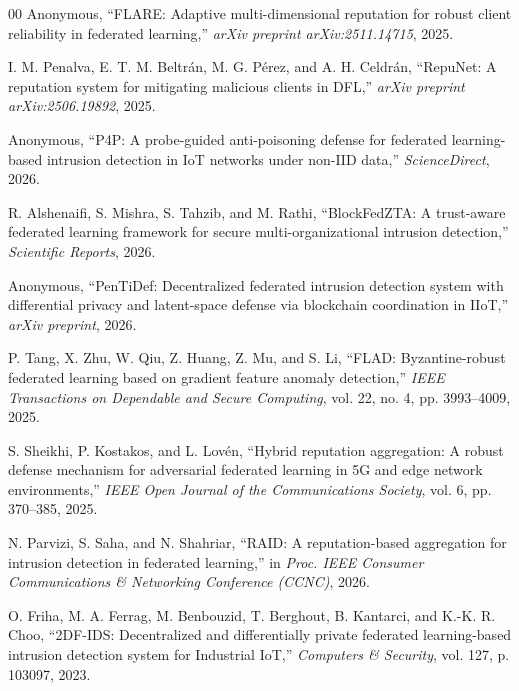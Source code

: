 \documentclass[conference]{IEEEtran}
\begin{document}
\begin{thebibliography}{00}
Anonymous, ``FLARE: Adaptive multi-dimensional reputation for robust client reliability in federated learning,'' \emph{arXiv preprint arXiv:2511.14715}, 2025.

I. M. Penalva, E. T. M. Beltr\'an, M. G. P\'erez, and A. H. Celdr\'an, ``RepuNet: A reputation system for mitigating malicious clients in DFL,'' \emph{arXiv preprint arXiv:2506.19892}, 2025.

Anonymous, ``P4P: A probe-guided anti-poisoning defense for federated learning-based intrusion detection in IoT networks under non-IID data,'' \emph{ScienceDirect}, 2026.

R. Alshenaifi, S. Mishra, S. Tahzib, and M. Rathi, ``BlockFedZTA: A trust-aware federated learning framework for secure multi-organizational intrusion detection,'' \emph{Scientific Reports}, 2026.

Anonymous, ``PenTiDef: Decentralized federated intrusion detection system with differential privacy and latent-space defense via blockchain coordination in IIoT,'' \emph{arXiv preprint}, 2026.

P. Tang, X. Zhu, W. Qiu, Z. Huang, Z. Mu, and S. Li, ``FLAD: Byzantine-robust federated learning based on gradient feature anomaly detection,'' \emph{IEEE Transactions on Dependable and Secure Computing}, vol. 22, no. 4, pp. 3993--4009, 2025.

S. Sheikhi, P. Kostakos, and L. Lov\'en, ``Hybrid reputation aggregation: A robust defense mechanism for adversarial federated learning in 5G and edge network environments,'' \emph{IEEE Open Journal of the Communications Society}, vol. 6, pp. 370--385, 2025.

N. Parvizi, S. Saha, and N. Shahriar, ``RAID: A reputation-based aggregation for intrusion detection in federated learning,'' in \emph{Proc. IEEE Consumer Communications \& Networking Conference (CCNC)}, 2026.

O. Friha, M. A. Ferrag, M. Benbouzid, T. Berghout, B. Kantarci, and K.-K. R. Choo, ``2DF-IDS: Decentralized and differentially private federated learning-based intrusion detection system for Industrial IoT,'' \emph{Computers \& Security}, vol. 127, p. 103097, 2023.

\end{thebibliography}
\end{document}
